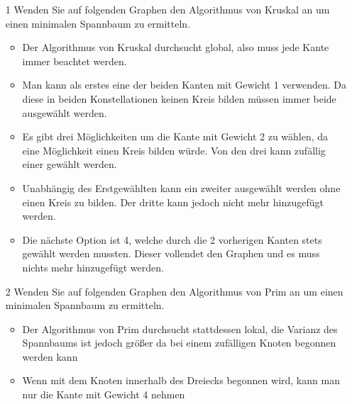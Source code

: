 \documentclass{article}
\begin{document}
	\begin{itemize}
		\item[1]{Wenden Sie auf folgenden Graphen den Algorithmus von Kruskal an um einen minimalen Spannbaum zu ermitteln.}
		\begin{itemize}
			\item{Der Algorithmus von Kruskal durchsucht global, also muss jede Kante immer beachtet werden.}
			\item{Man kann als erstes eine der beiden Kanten mit Gewicht 1 verwenden. Da diese in beiden Konstellationen keinen Kreis bilden müssen immer beide ausgewählt werden.}
			\item{Es gibt drei Möglichkeiten um die Kante mit Gewicht 2 zu wählen, da eine Möglichkeit einen Kreis bilden würde. Von den drei kann zufällig einer gewählt werden.}
			\item{Unabhängig des Erstgewählten kann ein zweiter ausgewählt werden ohne einen Kreis zu bilden. Der dritte kann jedoch nicht mehr hinzugefügt werden.}
			\item{Die nächste Option ist 4, welche durch die 2 vorherigen Kanten stets gewählt werden mussten. Dieser vollendet den Graphen und es muss nichts mehr hinzugefügt werden.}
		\end{itemize}
		\item[2]{Wenden Sie auf folgenden Graphen den Algorithmus von Prim an um einen minimalen Spannbaum zu ermitteln.}
		\begin{itemize}
			\item{Der Algorithmus von Prim durchsucht stattdessen lokal, die Varianz des Spannbaums ist jedoch größer da bei einem zufälligen Knoten begonnen werden kann}
			\item{Wenn mit dem Knoten innerhalb des Dreiecks begonnen wird, kann man nur die Kante mit Gewicht 4 nehmen}
		\end{itemize}

	\end{itemize}




	

	























  
\end{document}
